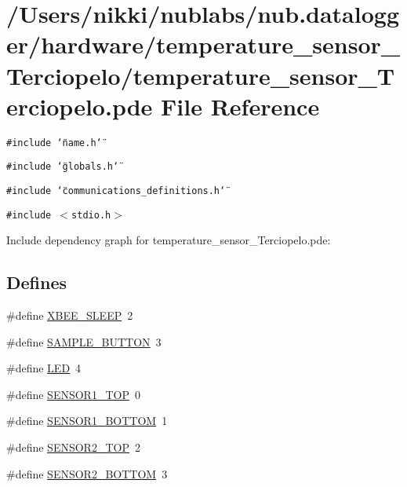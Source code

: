 \hypertarget{temperature__sensor___terciopelo_8pde}{
\section{/Users/nikki/nublabs/nub.datalogger/hardware/temperature\_\-sensor\_\-Terciopelo/temperature\_\-sensor\_\-Terciopelo.pde File Reference}
\label{temperature__sensor___terciopelo_8pde}
}
{\tt \#include \char`\"{}name.h\char`\"{}}\par
{\tt \#include \char`\"{}globals.h\char`\"{}}\par
{\tt \#include \char`\"{}communications\_\-definitions.h\char`\"{}}\par
{\tt \#include $<$stdio.h$>$}\par


Include dependency graph for temperature\_\-sensor\_\-Terciopelo.pde:\subsection*{Defines}
\begin{CompactItemize}
\item 
\#define \hyperlink{temperature__sensor___terciopelo_8pde_658c2878485cfe5cc625d283a6d34bc1}{XBEE\_\-SLEEP}~2
\item 
\#define \hyperlink{temperature__sensor___terciopelo_8pde_b2de299215608c2a35f0feb86adc2f6f}{SAMPLE\_\-BUTTON}~3
\item 
\#define \hyperlink{temperature__sensor___terciopelo_8pde_eb7a7ba1ab7e0406f1b5ab36d579f585}{LED}~4
\item 
\#define \hyperlink{temperature__sensor___terciopelo_8pde_2a2946288d28852ba343b09fd4f17d7a}{SENSOR1\_\-TOP}~0
\item 
\#define \hyperlink{temperature__sensor___terciopelo_8pde_0da2a51dcb3e00b10aedd07d75f22382}{SENSOR1\_\-BOTTOM}~1
\item 
\#define \hyperlink{temperature__sensor___terciopelo_8pde_645141ae2ab7fa7ac3f690c4959b6baf}{SENSOR2\_\-TOP}~2
\item 
\#define \hyperlink{temperature__sensor___terciopelo_8pde_df66e6da6cf8c78004dc0a75fd14d3b1}{SENSOR2\_\-BOTTOM}~3
\end{CompactItemize}
